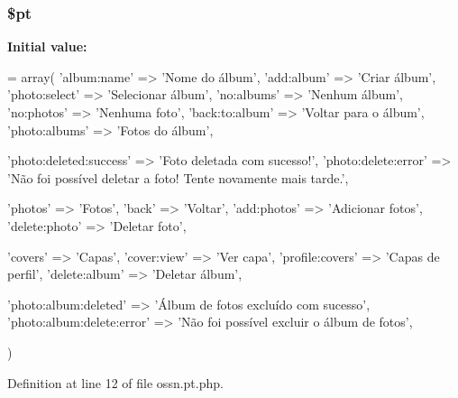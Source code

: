 \subsubsection[{\texorpdfstring{\$pt}{$pt}}]{\setlength{\rightskip}{0pt plus 5cm}\$pt}\hypertarget{components_2_ossn_photos_2locale_2ossn_8pt_8php_a62c150775a7a00e8663463c638016cad}{}\label{components_2_ossn_photos_2locale_2ossn_8pt_8php_a62c150775a7a00e8663463c638016cad}
{\bfseries Initial value\+:}
\begin{DoxyCode}
= array(
    \textcolor{stringliteral}{'album:name'} => \textcolor{stringliteral}{'Nome do álbum'},
    \textcolor{stringliteral}{'add:album'} => \textcolor{stringliteral}{'Criar álbum'},
    \textcolor{stringliteral}{'photo:select'} => \textcolor{stringliteral}{'Selecionar álbum'},
    \textcolor{stringliteral}{'no:albums'} => \textcolor{stringliteral}{'Nenhum álbum'},
    \textcolor{stringliteral}{'no:photos'} => \textcolor{stringliteral}{'Nenhuma foto'},
    \textcolor{stringliteral}{'back:to:album'} => \textcolor{stringliteral}{'Voltar para o álbum'},
    \textcolor{stringliteral}{'photo:albums'} => \textcolor{stringliteral}{'Fotos do álbum'},
    
    \textcolor{stringliteral}{'photo:deleted:success'} => \textcolor{stringliteral}{'Foto deletada com sucesso!'},
    \textcolor{stringliteral}{'photo:delete:error'} => \textcolor{stringliteral}{'Não foi possível deletar a foto! Tente novamente mais tarde.'},
    
    \textcolor{stringliteral}{'photos'} => \textcolor{stringliteral}{'Fotos'},
    \textcolor{stringliteral}{'back'} => \textcolor{stringliteral}{'Voltar'},
    \textcolor{stringliteral}{'add:photos'} => \textcolor{stringliteral}{'Adicionar fotos'},
    \textcolor{stringliteral}{'delete:photo'} => \textcolor{stringliteral}{'Deletar foto'},
    
    \textcolor{stringliteral}{'covers'} => \textcolor{stringliteral}{'Capas'},
    \textcolor{stringliteral}{'cover:view'} => \textcolor{stringliteral}{'Ver capa'},
    \textcolor{stringliteral}{'profile:covers'} => \textcolor{stringliteral}{'Capas de perfil'},
    \textcolor{stringliteral}{'delete:album'} => \textcolor{stringliteral}{'Deletar álbum'},
    
    \textcolor{stringliteral}{'photo:album:deleted'} => \textcolor{stringliteral}{'Álbum de fotos excluído com sucesso'},
    \textcolor{stringliteral}{'photo:album:delete:error'} => \textcolor{stringliteral}{'Não foi possível excluir o álbum de fotos'},
    

)
\end{DoxyCode}


Definition at line 12 of file ossn.\+pt.\+php.

